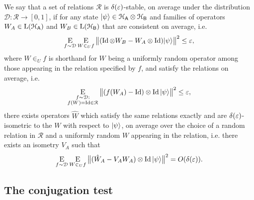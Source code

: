 \begin{definition}
We say that a set of relations $\mathcal{R}$ is $\delta(\varepsilon)$-stable, on average under the distribution $\mathcal{D}:\mathcal{R}\to[0,1]$, if for any state $|\psi\rangle\in\mathcal{H}_{\textsf{A}}\otimes \mathcal{H}_{\textsf{B}}$ and families of operators $W_A\in\mathrm{L}(\mathcal{H}_{\textsf{A}})$ and  $W_B\in\mathrm{L}(\mathcal{H}_{\textsf{B}})$ that are consistent on average, i.e. 
$$\mathop{\textsc{E}}_{f \sim\mathcal{D}} \mathop{\textsc{E}}_{W \in_U f} \big\| (\mathop{\rm Id}\nolimits\otimes W_B - W_A \otimes \mathop{\rm Id}\nolimits)|\psi\rangle\big\|^2\leq \varepsilon,$$
where $W \in_U f$ is shorthand for $W$ being a uniformly random operator among those appearing in the relation specified by $f$,
and satisfy the relations on average, i.e. 
$$\mathop{\textsc{E}}_{\substack{f\sim\mathcal{D}:\\f(W)=\mathop{\rm Id}\nolimits \in\mathcal{R}}} \big\|  (f(W_A)- \mathop{\rm Id}\nolimits) \otimes \mathop{\rm Id}\nolimits |\psi\rangle\big\|^2 \leq \varepsilon,$$
  there exists operators $\hat{W}$ which satisfy the same relations exactly and are $\delta(\varepsilon)$-isometric to the $W$ with respect to $|\psi\rangle$, on average over the choice of a random relation in $\mathcal{R}$ and a uniformly random $W$ appearing in the relation, i.e. there exists an isometry $V_A$ such that 
  \begin{equation}
    \mathop{\textsc{E}}_{f \sim\mathcal{D}} \mathop{\textsc{E}}_{W \in_U f} \big\|( \hat{W}_A-V_A W_A)\otimes \mathop{\rm Id}\nolimits |\psi\rangle\big\|^2=O(\delta(\varepsilon)).\nonumber
  \end{equation}
	\end{definition}


\subsection{The conjugation test}
\label{sec:conj-test}

